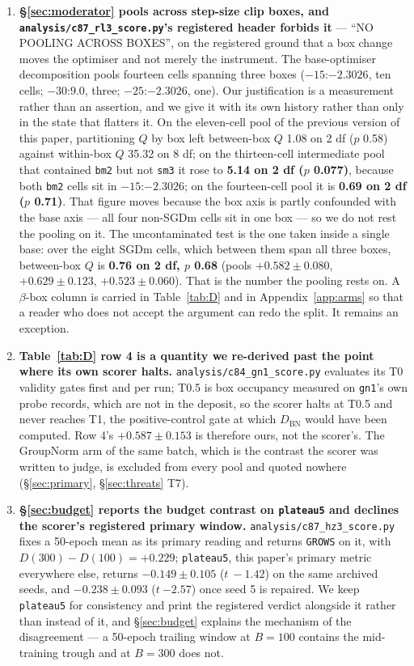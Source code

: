 \documentclass[10pt,letterpaper]{article}
\newcommand{\Dstat}{D}                         %
\newcommand{\plateau}{\texttt{plateau5}}
\newcommand{\arm}[1]{\texttt{#1}}
\begin{document}
\begin{enumerate}
\item \textbf{\S\ref{sec:moderator} pools across step-size clip boxes, and
  \texttt{analysis/c87\_rl3\_score.py}'s registered header forbids it} --- ``NO POOLING ACROSS
  BOXES'', on the registered ground that a box change moves the optimiser and not merely the
  instrument. The base-optimiser decomposition pools fourteen cells spanning three boxes
  ($-15$:$-2.3026$, ten cells; $-30$:$9.0$, three; $-25$:$-2.3026$, one). Our justification is a
  measurement rather than an assertion, and we give it with its own history rather than only in
  the state that flatters it. On the eleven-cell pool of the previous version of this paper, partitioning $Q$ by
  box left between-box $Q$ 1.08 on 2 df ($p$ 0.58) against within-box $Q$ 35.32 on 8 df; on the
  thirteen-cell intermediate pool that contained \arm{bm2} but not \arm{sm3} it rose to
  \textbf{5.14 on 2 df ($p$ 0.077)}, because both \arm{bm2} cells sit in $-15$:$-2.3026$; on the
  fourteen-cell pool it is \textbf{0.69 on 2 df ($p$ 0.71)}. That figure moves because the box
  axis is partly confounded with the base axis --- all four non-SGDm cells sit in one box --- so
  we do not rest the pooling on it. The uncontaminated test is the one taken inside a single
  base: over the eight SGDm cells, which between them span all three boxes, between-box $Q$ is
  \textbf{0.76 on 2 df, $p$ 0.68} (pools $+0.582 \pm 0.080$, $+0.629 \pm 0.123$,
  $+0.523 \pm 0.060$). That is the number the pooling rests on. A $\beta$-box column is carried
  in Table~\ref{tab:D} and in Appendix~\ref{app:arms} so that a reader who does not accept the
  argument can redo the split. It remains an exception.
\item \textbf{Table~\ref{tab:D} row 4 is a quantity we re-derived past the point where its own
  scorer halts.} \texttt{analysis/c84\_gn1\_score.py} evaluates its T0 validity gates first and
  per run; T0.5 is box occupancy measured on \arm{gn1}'s own probe records, which are not in the
  deposit, so the scorer halts at T0.5 and never reaches T1, the positive-control gate at which
  $\Dstat_{\mathrm{BN}}$ would have been computed. Row 4's $+0.587 \pm 0.153$ is therefore ours,
  not the scorer's. The GroupNorm arm of the same batch, which is the contrast the scorer was
  written to judge, is excluded from every pool and quoted nowhere (\S\ref{sec:primary},
  \S\ref{sec:threats} T7).
\item \textbf{\S\ref{sec:budget} reports the budget contrast on \plateau{} and declines the
  scorer's registered primary window.} \texttt{analysis/c87\_hz3\_score.py} fixes a 50-epoch mean
  as its primary reading and returns \texttt{GROWS} on it, with
  $\Dstat(300) - \Dstat(100) = +0.229$; \plateau{}, this paper's primary metric everywhere else,
  returns $-0.149 \pm 0.105$ ($t\ -1.42$) on the same archived seeds, and
$\mathbf{-0.238 \pm 0.093}$ ($t\ \mathbf{-2.57}$) once seed 5 is repaired. We keep \plateau{} for
consistency and print the
  registered verdict alongside it rather than instead of it, and \S\ref{sec:budget} explains the
  mechanism of the disagreement --- a 50-epoch trailing window at $B = 100$ contains the
  mid-training trough and at $B = 300$ does not.
\end{enumerate}
\end{document}
